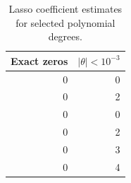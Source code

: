 \begin{table}[htbp]
    \centering
    \caption{Lasso coefficient estimates for selected polynomial degrees.}
    \label{tab:lasso-theta}
\begin{tabular}{rr}
\hline\hline
Exact zeros & $|\theta| < 10^{-3}$ \\
\hline
0 & 0 \\
0 & 2 \\
0 & 0 \\
0 & 2 \\
0 & 3 \\
0 & 4 \\
\hline\hline
\end{tabular}
\end{table}
